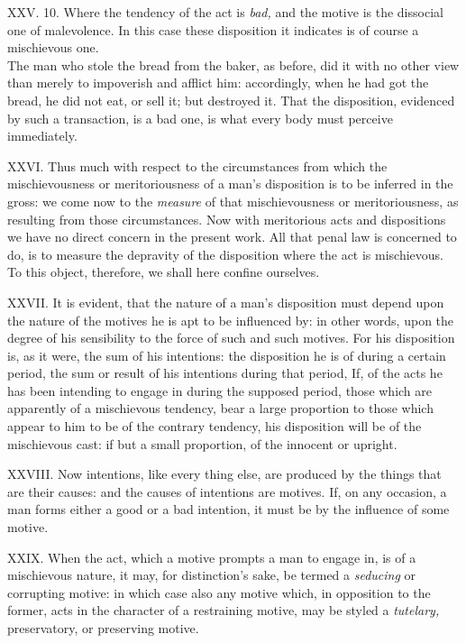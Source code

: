 \documentclass[12pt]{report}
\begin{document}
XXV. 10. Where the tendency of the act is \emph{bad,} and the motive is
the dissocial one of malevolence. In this case these disposition it
indicates is of course a mischievous one.\\
The man who stole the bread from the baker, as before, did it with no
other view than merely to impoverish and afflict him: accordingly, when
he had got the bread, he did not eat, or sell it; but destroyed it. That
the disposition, evidenced by such a transaction, is a bad one, is what
every body must perceive immediately.

XXVI. Thus much with respect to the circumstances from which the
mischievousness or meritoriousness of a man's disposition is to be
inferred in the gross: we come now to the \emph{measure} of that
mischievousness or meritoriousness, as resulting from those
circumstances. Now with meritorious acts and dispositions we have no
direct concern in the present work. All that penal law is concerned to
do, is to measure the depravity of the disposition where the act is
mischievous. To this object, therefore, we shall here confine ourselves.

XXVII. It is evident, that the nature of a man's disposition must depend
upon the nature of the motives he is apt to be influenced by: in other
words, upon the degree of his sensibility to the force of such and such
motives. For his disposition is, as it were, the sum of his intentions:
the disposition he is of during a certain period, the sum or result of
his intentions during that period, If, of the acts he has been intending
to engage in during the supposed period, those which are apparently of a
mischievous tendency, bear a large proportion to those which appear to
him to be of the contrary tendency, his disposition will be of the
mischievous cast: if but a small proportion, of the innocent or upright.

XXVIII. Now intentions, like every thing else, are produced by the
things that are their causes: and the causes of intentions are motives.
If, on any occasion, a man forms either a good or a bad intention, it
must be by the influence of some motive.

XXIX. When the act, which a motive prompts a man to engage in, is of a
mischievous nature, it may, for distinction's sake, be termed a
\emph{seducing} or corrupting motive: in which case also any motive
which, in opposition to the former, acts in the character of a
restraining motive, may be styled a \emph{tutelary,} preservatory, or
preserving motive.
\end{document}
